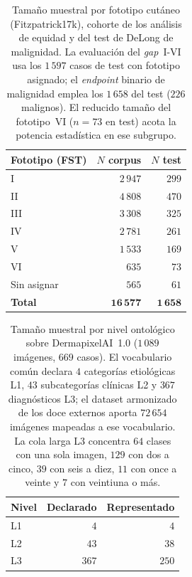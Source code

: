 \begin{table}[htbp]
\centering
\footnotesize
\caption{Tamaño muestral por fototipo cutáneo (Fitzpatrick17k),
cohorte de los análisis de equidad y del test de DeLong de
malignidad. La evaluación del \emph{gap}~I-VI usa los $1\,597$ casos
de test con fototipo asignado; el \emph{endpoint} binario de
malignidad emplea los $1\,658$ del test ($226$ malignos). El reducido
tamaño del fototipo~VI ($n = 73$ en test) acota la potencia
estadística en ese subgrupo.}
\label{tab:muestral-fst}
\begin{tabular}{lrr}
\hline
Fototipo (FST) & $N$ corpus & $N$ test \\
\hline
I    & $2\,947$ & $299$ \\
II   & $4\,808$ & $470$ \\
III  & $3\,308$ & $325$ \\
IV   & $2\,781$ & $261$ \\
V    & $1\,533$ & $169$ \\
VI   & $635$    & $73$  \\
Sin asignar & $565$ & $61$ \\
\hline
\textbf{Total} & $\mathbf{16\,577}$ & $\mathbf{1\,658}$ \\
\hline
\end{tabular}
\end{table}

\begin{table}[htbp]
\centering
\footnotesize
\caption{Tamaño muestral por nivel ontológico sobre DermapixelAI~1.0
($1\,089$ imágenes, $669$ casos). El vocabulario común declara $4$
categorías etiológicas L1, $43$ subcategorías clínicas L2 y $367$
diagnósticos L3; el dataset armonizado de los doce externos aporta
$72\,654$ imágenes mapeadas a ese vocabulario. La cola larga L3
concentra $64$ clases con una sola imagen, $129$ con dos a cinco, $39$
con seis a diez, $11$ con once a veinte y $7$ con veintiuna o más.}
\label{tab:muestral-nivel}
\begin{tabular}{lrr}
\hline
Nivel & Declarado & Representado \\
\hline
L1 & $4$   & $4$ \\
L2 & $43$  & $38$ \\
L3 & $367$ & $250$ \\
\hline
\end{tabular}
\end{table}

